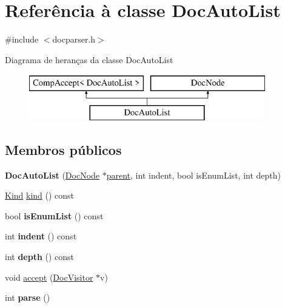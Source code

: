\hypertarget{class_doc_auto_list}{\section{Referência à classe Doc\-Auto\-List}
\label{class_doc_auto_list}
}


{\ttfamily \#include $<$docparser.\-h$>$}

Diagrama de heranças da classe Doc\-Auto\-List\begin{figure}[H]
\begin{center}
\leavevmode
\includegraphics[height=2.000000cm]{class_doc_auto_list}
\end{center}
\end{figure}
\subsection*{Membros públicos}
\begin{DoxyCompactItemize}
\item 
\hypertarget{class_doc_auto_list_ad35aac43d2b56f2e7b59d643bb15c193}{{\bfseries Doc\-Auto\-List} (\hyperlink{class_doc_node}{Doc\-Node} $\ast$\hyperlink{class_doc_node_abd7f070d6b0a38b4da71c2806578d19d}{parent}, int indent, bool is\-Enum\-List, int depth)}\label{class_doc_auto_list_ad35aac43d2b56f2e7b59d643bb15c193}

\item 
\hyperlink{class_doc_node_aa10c9e8951b8ccf714a59ec321bdac5b}{Kind} \hyperlink{class_doc_auto_list_aa9d037bed9f9a083d0cd01485637d843}{kind} () const 
\item 
\hypertarget{class_doc_auto_list_a7eccf0b9b18da62d308f81dba6db172f}{bool {\bfseries is\-Enum\-List} () const }\label{class_doc_auto_list_a7eccf0b9b18da62d308f81dba6db172f}

\item 
\hypertarget{class_doc_auto_list_ae94194a3bbb081b2e956a6699306c1a9}{int {\bfseries indent} () const }\label{class_doc_auto_list_ae94194a3bbb081b2e956a6699306c1a9}

\item 
\hypertarget{class_doc_auto_list_a3275d1392d01b26af1c8cd52b0d10745}{int {\bfseries depth} () const }\label{class_doc_auto_list_a3275d1392d01b26af1c8cd52b0d10745}

\item 
void \hyperlink{class_doc_auto_list_a7ba716e854ae2f8f87a4eb2140e302b6}{accept} (\hyperlink{class_doc_visitor}{Doc\-Visitor} $\ast$v)
\item 
\hypertarget{class_doc_auto_list_a67007fc2be130666fbf3b065022756f4}{int {\bfseries parse} ()}\label{class_doc_auto_list_a67007fc2be130666fbf3b065022756f4}

\end{DoxyCompactItemize}
